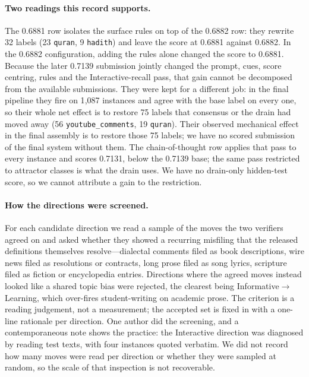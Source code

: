 \documentclass[11pt]{article}
\begin{document}
\paragraph{Two readings this record supports.} The 0.6881 row isolates the surface rules on top
of the 0.6882 row: they rewrite 32 labels (23 \texttt{quran}, 9 \texttt{hadith}) and leave the
score at 0.6881 against 0.6882. In the 0.6882 configuration, adding the rules alone changed the score to 0.6881. Because the
later 0.7139 submission jointly changed the prompt, cues, score centring, rules and the
Interactive-recall pass, that gain cannot be decomposed from the available submissions.
They were kept for a different job: in the final pipeline they fire on 1{,}087 instances and
agree with the base label on every one, so their whole net effect is to restore 75 labels that
consensus or the drain had moved away (56 \texttt{youtube\_comments}, 19 \texttt{quran}). Their
observed mechanical effect in the final assembly is to restore those 75 labels; we have no scored
submission of the final system without them.
The chain-of-thought row applies that pass to every instance and scores 0.7131,
below the 0.7139 base; the same pass restricted to attractor classes is what the drain uses. We
have no drain-only hidden-test score, so we cannot attribute a gain to the restriction.

\paragraph{How the directions were screened.} For each candidate direction we read a sample of
the moves the two verifiers agreed on and asked whether they showed a recurring misfiling that
the released definitions themselves resolve---dialectal comments filed as book descriptions,
wire news filed as resolutions or contracts, long prose filed as song lyrics, scripture filed as
fiction or encyclopedia entries. Directions where the agreed moves instead looked like a shared
topic bias were rejected, the clearest being Informative$\rightarrow$Learning, which over-fires
student-writing on academic prose. The criterion is a reading judgement, not a measurement; the
accepted set is fixed in  with a one-line rationale per direction. One
author did the screening, and a contemporaneous note shows the practice: the Interactive
direction was diagnosed by reading test texts, with four instances quoted verbatim. We did not
record how many moves were read per direction or whether they were sampled at random, so the
scale of that inspection is not recoverable.
\end{document}
